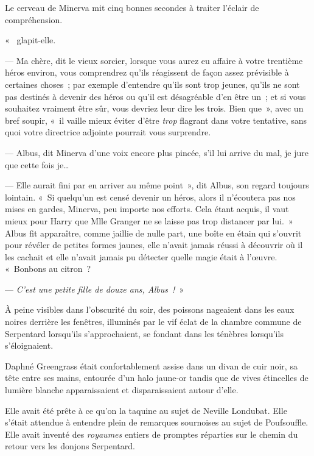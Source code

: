 Le cerveau de Minerva mit cinq bonnes secondes à traiter l'éclair de compréhension.

«~ glapit-elle.

--- Ma chère, dit le vieux sorcier, lorsque vous aurez eu affaire à votre trentième héros environ, vous comprendrez qu'ils réagissent de façon assez prévisible à certaines choses~; par exemple d'entendre qu'ils sont trop jeunes, qu'ils ne sont pas destinés à devenir des héros ou qu'il est désagréable d'en être un~; et si vous souhaitez vraiment être sûr, vous devriez leur dire les trois.
Bien que~», avec un bref soupir, «~il vaille mieux éviter d'être \emph{trop} flagrant dans votre tentative, sans quoi votre directrice adjointe pourrait vous surprendre.

--- Albus, dit Minerva d'une voix encore plus pincée, s'il lui arrive du mal, je jure que cette fois je…

--- Elle aurait fini par en arriver au même point~», dit Albus, son regard toujours lointain.
«~Si quelqu'un est censé devenir un héros, alors il n'écoutera pas nos mises en gardes, Minerva, peu importe nos efforts.
Cela étant acquis, il vaut mieux pour Harry que Mlle Granger ne se laisse pas trop distancer par lui.~»
Albus fit apparaître, comme jaillie de nulle part, une boîte en étain qui s'ouvrit pour révéler de petites formes jaunes, elle n'avait jamais réussi à découvrir où il les cachait et elle n'avait jamais pu détecter quelle magie était à l'œuvre.
«~Bonbons au citron~?

--- \emph{C'est une petite fille de douze ans, Albus~!}~»


À peine visibles dans l'obscurité du soir, des poissons nageaient dans les eaux noires derrière les fenêtres, illuminés par le vif éclat de la chambre commune de Serpentard lorsqu'ils s'approchaient, se fondant dans les ténèbres lorsqu'ils s'éloignaient.

Daphné Greengrass était confortablement assise dans un divan de cuir noir, sa tête entre ses mains, entourée d'un halo jaune-or tandis que de vives étincelles de lumière blanche apparaissaient et disparaissaient autour d'elle.

Elle avait été prête à ce qu'on la taquine au sujet de Neville Londubat.
Elle s'était attendue à entendre plein de remarques sournoises au sujet de Poufsouffle.
Elle avait inventé des \emph{royaumes} entiers de promptes réparties sur le chemin du retour vers les donjons Serpentard.

